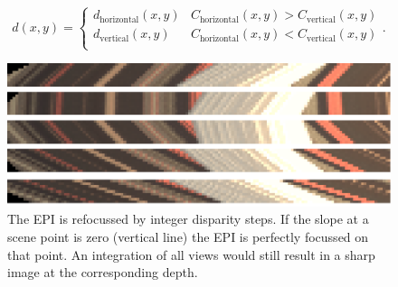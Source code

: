 \documentclass  [
  paper    = a4,
  BCOR     = 10mm,
  twoside,
  fontsize = 12pt,
  fleqn,
  toc      = bibnumbered,
  toc      = listofnumbered,
  numbers  = noendperiod,
  headings = normal,
  listof   = leveldown,
  version  = 3.03
]                                       {scrreprt}
\begin{document}
 \begin{equation}\label{key}
 d(x,y) = \begin{cases} d_\text{horizontal}(x,y) & C_\text{horizontal}(x,y)>C_\text{vertical}(x,y)\\
 						d_\text{vertical}(x,y) & C_\text{horizontal}(x,y)<C_\text{vertical}(x,y)\\
 		\end{cases}.
 \end{equation} 
  \begin{figure}[h!]
 	\centering
 	\includegraphics[width=0.7\linewidth]{images/refocused_cut}
 	\caption[Refocussed EPI]{The EPI is refocussed by integer disparity steps. If the slope at a scene point is zero (vertical line) the EPI is perfectly focussed on that point. An integration of all views would still result in a sharp image at the corresponding depth.}
 	\label{fig:refocusedcut}
 \end{figure}
\end{document}
